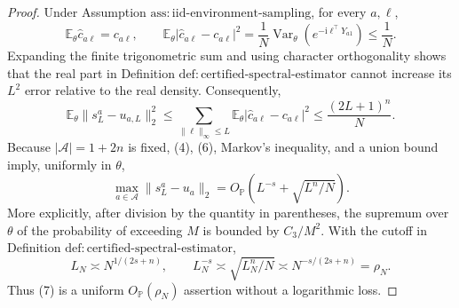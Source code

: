 \documentclass{article}
\begin{document}
\begin{proof}
Under Assumption \(\mathrm{ass:iid\text{-}environment\text{-}sampling}\), for every \(a,\ell\),
\[
 \mathbb E_\theta\widehat c_{a\ell}=c_{a\ell},
 \qquad
 \mathbb E_\theta|\widehat c_{a\ell}-c_{a\ell}|^2
 =\frac1N\operatorname{Var}_\theta(e^{-\mathrm i\ell^\top Y_{a1}})
 \leq\frac1N.
\tag{5}
\]
Expanding the finite trigonometric sum and using character orthogonality shows that the real part in Definition \(\mathrm{def:certified\text{-}spectral\text{-}estimator}\) cannot increase its \(L^2\) error relative to the real density.  Consequently,
\[
 \mathbb E_\theta\lVert s_L^a-u_{a,L}\rVert_2^2
 \leq\sum_{\lVert\ell\rVert_\infty\leq L}
       \mathbb E_\theta|\widehat c_{a\ell}-c_{a\ell}|^2
 \leq\frac{(2L+1)^n}{N}.
\tag{6}
\]
Because \(|\mathcal A|=1+2n\) is fixed, (4), (6), Markov's inequality, and a union bound imply, uniformly in \(\theta\),
\[
 \max_{a\in\mathcal A}\lVert s_L^a-u_a\rVert_2
 =O_{\mathbb P}\!\left(L^{-s}+\sqrt{L^n/N}\right).
\tag{7}
\]
More explicitly, after division by the quantity in parentheses, the supremum over \(\theta\) of the probability of exceeding \(M\) is bounded by \(C_3/M^2\).  With the cutoff in Definition \(\mathrm{def:certified\text{-}spectral\text{-}estimator}\),
\[
 L_N\asymp N^{1/(2s+n)},
 \qquad
 L_N^{-s}\asymp\sqrt{L_N^n/N}
 \asymp N^{-s/(2s+n)}=\rho_N.
\tag{8}
\]
Thus (7) is a uniform \(O_{\mathbb P}(\rho_N)\) assertion without a logarithmic loss.


\end{proof}
\end{document}
